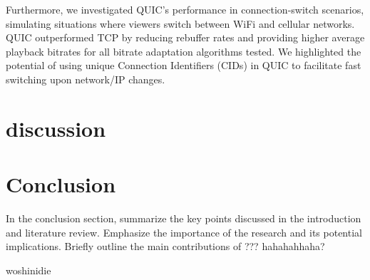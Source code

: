 \documentclass{article}
\begin{document}
Furthermore, we investigated QUIC's performance in connection-switch scenarios, simulating situations where viewers switch between WiFi and cellular networks. QUIC outperformed TCP by reducing rebuffer rates and providing higher average playback bitrates for all bitrate adaptation algorithms tested. We highlighted the potential of using unique Connection Identifiers (CIDs) in QUIC to facilitate fast switching upon network/IP changes.
\section{discussion}

\section{Conclusion}
In the conclusion section, summarize the key points discussed in the introduction and literature review. Emphasize the importance of the research and its potential implications. Briefly outline the main contributions of ???
hahahahhaha?

woshinidie
\end{document}
